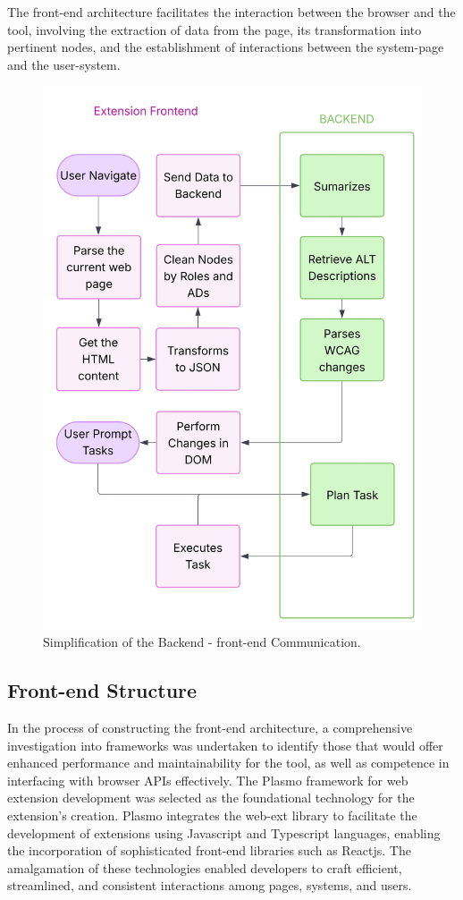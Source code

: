 \documentclass[conference]{IEEEtran}
\begin{document}
The front-end architecture facilitates the interaction between the browser and the tool, involving the extraction of data from the page, its transformation into pertinent nodes, and the establishment of interactions between the system-page and the user-system.

\begin{figure}[h]
\centering
\includegraphics[width=\columnwidth]{images/5.jpg}
\caption{Simplification of the Backend - front-end Communication.}
\label{fig:communication}
\end{figure}

\subsection{Front-end Structure}

In the process of constructing the front-end architecture, a comprehensive investigation into frameworks was undertaken to identify those that would offer enhanced performance and maintainability for the tool, as well as competence in interfacing with browser APIs effectively. The Plasmo framework for web extension development was selected as the foundational technology for the extension's creation. Plasmo integrates the web-ext library to facilitate the development of extensions using Javascript and Typescript languages, enabling the incorporation of sophisticated front-end libraries such as Reactjs. The amalgamation of these technologies enabled developers to craft efficient, streamlined, and consistent interactions among pages, systems, and users.
\end{document}
